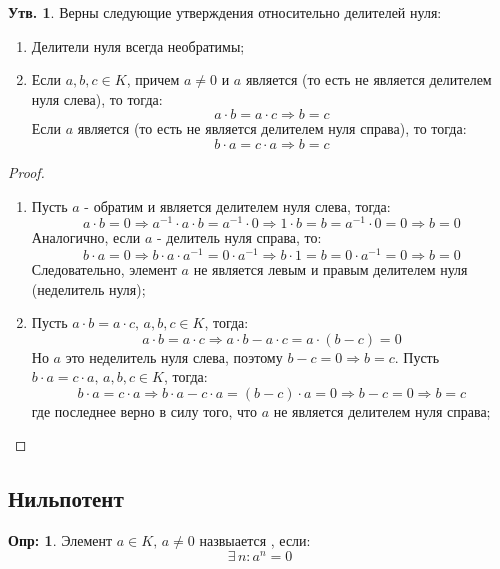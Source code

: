 \documentclass[12pt]{article}
\theoremstyle{definition}
\newtheorem{defn}{Опр:}
\newtheorem{prop}{Утв.}
\begin{document}
\newpage
\begin{prop} 
	Верны следующие утверждения относительно делителей нуля:
	\begin{enumerate}[label=\arabic*)]
		\item Делители нуля всегда необратимы;
		\item Если $a,b,c \in K$, причем $a \neq 0$ и $a$ является  (то есть не является делителем нуля слева), то тогда:
		$$
			a{\cdot}b = a{\cdot}c \Rightarrow b =c
		$$
		Если $a$ является  (то есть не является делителем нуля справа), то тогда:
		$$
			b{\cdot}a = c{\cdot}a \Rightarrow b = c
		$$
	\end{enumerate}
\end{prop}
\begin{proof}\hfill
	\begin{enumerate}[label=\arabic*)]
		\item Пусть $a$ - обратим и является делителем нуля слева, тогда:
		$$
			a{\cdot}b = 0 \Rightarrow a^{-1}{\cdot}a{\cdot}b = a^{-1}{\cdot}0  \Rightarrow 1{\cdot}b = b = a^{-1}{\cdot}0 = 0\Rightarrow b = 0
		$$
		Аналогично, если $a$ - делитель нуля справа, то:
		$$
			b{\cdot}a = 0 \Rightarrow b{\cdot}a{\cdot}a^{-1} = 0{\cdot}a^{-1} \Rightarrow b{\cdot}1 = b = 0{\cdot}a^{-1} = 0 \Rightarrow b = 0
		$$
		Следовательно, элемент $a$ не является левым и правым делителем нуля (неделитель нуля);
		\item Пусть $a{\cdot}b = a{\cdot}c, \, a,b,c \in K$, тогда:
		$$
			a{\cdot}b = a{\cdot}c \Rightarrow a{\cdot}b - a{\cdot}c = a{\cdot}(b-c) = 0
		$$
		Но $a$ это неделитель нуля слева, поэтому $b- c = 0 \Rightarrow b = c$. Пусть $b{\cdot}a = c{\cdot}a, \, a,b,c \in K$, тогда:
		$$
			b{\cdot}a = c{\cdot}a \Rightarrow b{\cdot}a - c{\cdot}a = (b-c){\cdot}a = 0 \Rightarrow b -c = 0 \Rightarrow b = c
		$$
		где последнее верно в силу того, что $a$ не является делителем нуля справа;
	\end{enumerate}
\end{proof}

\subsection*{Нильпотент}

\begin{defn}
	Элемент $a \in K, \, a \neq 0$ назвыается , если:
	$$
		\exists \, n \colon a^n = 0
	$$
\end{defn}
\end{document}
